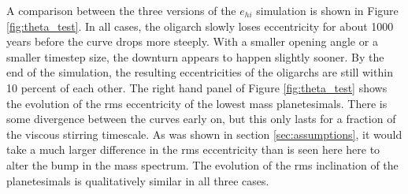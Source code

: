 A comparison between the three versions of the $e_{hi}$ simulation is shown in Figure \ref{fig:theta_test}. In all cases, the 
oligarch slowly loses eccentricity for about 1000 years before the curve drops more steeply. With a smaller opening angle or a 
smaller timestep size, the downturn appears to happen slightly sooner. By the end of the simulation, the resulting eccentricities 
of the oligarchs are still within 10 percent of each other. The right hand panel of Figure \ref{fig:theta_test} shows the evolution of 
the rms eccentricity of the lowest mass planetesimals. There is some divergence between the curves early on, but this only 
lasts for a fraction of the viscous stirring timescale. As was shown in section \ref{sec:assumptions}, it would take a much larger 
difference in the rms eccentricity than is seen here here to alter the bump in the mass spectrum. The evolution of the rms 
inclination of the planetesimals is qualitatively similar in all three cases.